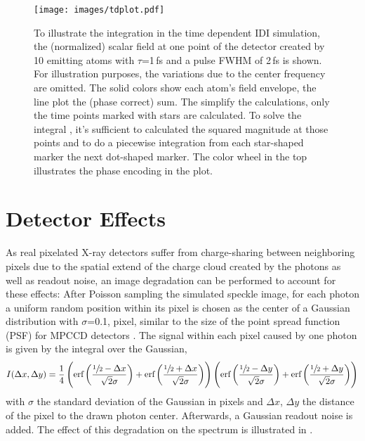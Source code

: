 \begin{figure}
	\centering
	\texttt{[image: images/tdplot.pdf]}
	\caption[Integration in time dependent IDI simulation]{To illustrate the integration in the time dependent IDI simulation, the (normalized) scalar field at one point of the detector created by 10 emitting atoms with $\tau$=1\,fs and a pulse FWHM of 2\,fs is shown. For illustration purposes, the variations due to the center frequency are omitted. The solid colors show each atom's field envelope, the line plot the (phase correct) sum. The simplify the calculations, only the time points marked with stars are calculated. To solve the integral , it's sufficient to calculated the squared magnitude at those points and to do a piecewise integration from each star-shaped marker the next dot-shaped marker. The color wheel in the top illustrates the phase encoding in the plot.}
	\label{fig:tdplot}
\end{figure}

\section{Detector Effects}
\label{sec:chargesharing}
As real pixelated X-ray detectors suffer from charge-sharing between neighboring pixels due to the spatial extend of the charge cloud created by the photons as well as readout noise, an image degradation can be performed to account for these effects: After Poisson sampling the simulated speckle image, for each photon a uniform random position within its pixel is chosen as the center of a Gaussian distribution with $\sigma$=0.1, pixel, similar to the size of the point spread function (PSF) for MPCCD detectors \cite{mpccd}.
The signal within each pixel caused by one photon is given by the integral over the Gaussian,
\begin{equation*}
	I(\Delta x,\Delta y)=\frac{1}{4} \left(\text{erf}\left(\frac{\sfrac{1}{2}-\Delta x}{\sqrt{2}
		\sigma}\right)+\text{erf}\left(\frac{\sfrac{1}{2}+\Delta x}{\sqrt{2} \sigma}\right)\right) \left(\text{erf}\left(\frac{\sfrac{1}{2}-\Delta y}{\sqrt{2}
		\sigma}\right)+\text{erf}\left(\frac{\sfrac{1}{2}+\Delta y}{\sqrt{2} \sigma}\right)\right)
\end{equation*}
with $\sigma$ the standard deviation of the Gaussian in pixels and $\Delta x$, $\Delta y$ the distance of the pixel to the drawn photon center. Afterwards, a Gaussian readout noise is added. The effect of this degradation on the spectrum is illustrated in .

